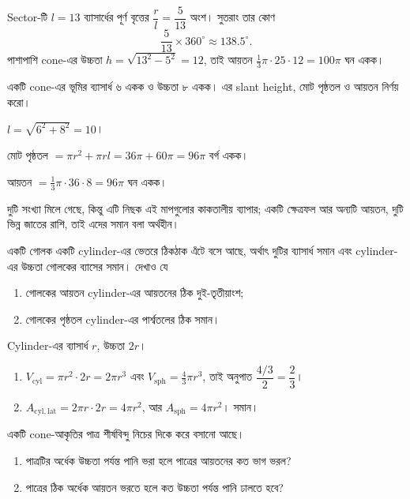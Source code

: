 \documentclass[11pt]{article}
\begin{document}
\begin{solbox}
Sector-টি $l = 13$ ব্যাসার্ধের পূর্ণ বৃত্তের $\dfrac{r}{l} = \dfrac{5}{13}$ অংশ।
সুতরাং তার কোণ
\[
  \frac{5}{13} \times 360^{\circ} \approx 138.5^{\circ} .
\]
পাশাপাশি cone-এর উচ্চতা $h = \sqrt{13^{2}-5^{2}} = 12$, তাই আয়তন
$\tfrac{1}{3}\pi \cdot 25 \cdot 12 = 100\pi$ ঘন একক।
\end{solbox}

 একটি cone-এর ভূমির ব্যাসার্ধ ৬ একক ও উচ্চতা ৮ একক। এর slant height,
মোট পৃষ্ঠতল ও আয়তন নির্ণয় করো।

\begin{sol}
$l = \sqrt{6^{2}+8^{2}} = 10$।

মোট পৃষ্ঠতল $= \pi r^{2} + \pi r l = 36\pi + 60\pi = 96\pi$ বর্গ একক।

আয়তন $= \tfrac{1}{3}\pi \cdot 36 \cdot 8 = 96\pi$ ঘন একক।

দুটি সংখ্যা মিলে গেছে, কিন্তু এটি নিছক এই মাপগুলোর কাকতালীয় ব্যাপার; একটি
ক্ষেত্রফল আর অন্যটি আয়তন, দুটি ভিন্ন জাতের রাশি, তাই এদের সমান বলা অর্থহীন।
\end{sol}

 একটি গোলক একটি cylinder-এর ভেতরে ঠিকঠাক এঁটে বসে আছে, অর্থাৎ দুটির
ব্যাসার্ধ সমান এবং cylinder-এর উচ্চতা গোলকের ব্যাসের সমান। দেখাও যে
\begin{enumerate}
  \item গোলকের আয়তন cylinder-এর আয়তনের ঠিক দুই-তৃতীয়াংশ;
  \item গোলকের পৃষ্ঠতল cylinder-এর পার্শ্বতলের ঠিক সমান।
\end{enumerate}

\begin{sol}
Cylinder-এর ব্যাসার্ধ $r$, উচ্চতা $2r$।
\begin{enumerate}
  \item $V_{\mathrm{cyl}} = \pi r^{2} \cdot 2r = 2\pi r^{3}$ এবং
        $V_{\mathrm{sph}} = \tfrac{4}{3}\pi r^{3}$, তাই অনুপাত
        $\dfrac{4/3}{2} = \dfrac{2}{3}$।
  \item $A_{\mathrm{cyl,lat}} = 2\pi r \cdot 2r = 4\pi r^{2}$, আর
        $A_{\mathrm{sph}} = 4\pi r^{2}$। সমান।
\end{enumerate}
\end{sol}

 একটি cone-আকৃতির পাত্র শীর্ষবিন্দু নিচের দিকে করে বসানো আছে।
\begin{enumerate}
  \item পাত্রটির অর্ধেক উচ্চতা পর্যন্ত পানি ভরা হলে পাত্রের আয়তনের কত ভাগ ভরল?
  \item পাত্রের ঠিক অর্ধেক আয়তন ভরতে হলে কত উচ্চতা পর্যন্ত পানি ঢালতে হবে?
\end{enumerate}
\end{document}
